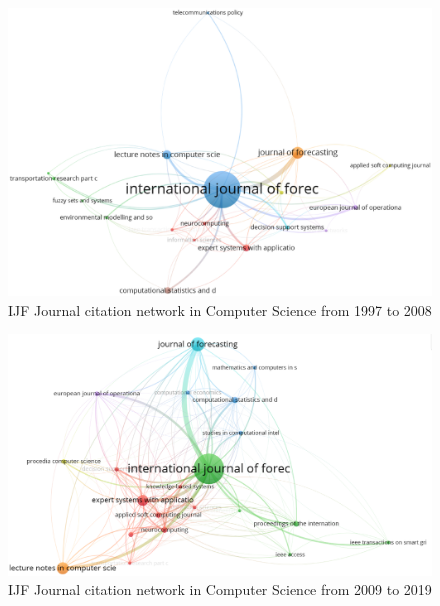 \documentclass[11pt,a4paper]{elsarticle} %
\begin{document}
\begin{figure}[!htbp]
\centering
\includegraphics[scale=0.3]{fig.9.eps}
\caption{ IJF Journal citation network in Computer Science from 1997 to 2008}
\end{figure}

\begin{figure}[!htbp]
\centering
\includegraphics[scale=0.3]{fig.10.eps}
\caption{ IJF Journal citation network in Computer Science from 2009 to 2019}
\end{figure}
\end{document}
